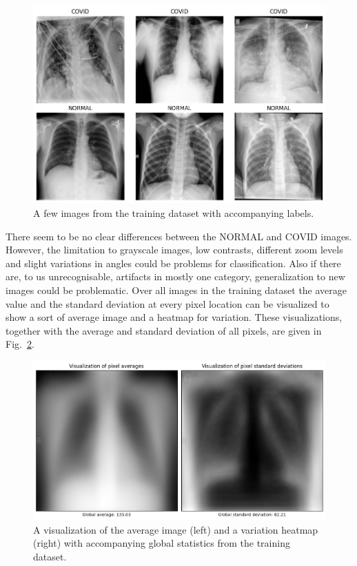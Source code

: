 \documentclass[conference]{IEEEtran}
\begin{document}
\begin{figure}[htbp]
\centerline{\includegraphics[width=\linewidth]{Images/example_images.png}}
\caption{A few images from the training dataset with accompanying labels.}
\label{fig:example_images}
\end{figure}

There seem to be no clear differences between the NORMAL and COVID images. However, the limitation to grayscale images, low contrasts, different zoom levels and slight variations in angles could be problems for classification. Also if there are, to us unrecognisable, artifacts in mostly one category, generalization to new images could be problematic.
Over all images in the training dataset the average value and the standard deviation at every pixel location can be visualized to show a sort of average image and a heatmap for variation. These visualizations, together with the average and standard deviation of all pixels, are given in Fig.~\ref{fig:pixel_statistics}.

\begin{figure}[htbp]
\centerline{\includegraphics[width=\linewidth]{Images/pixel_statistics.png}}
\caption{A visualization of the average image (left) and a variation heatmap (right) with accompanying global statistics from the training dataset.}
\label{fig:pixel_statistics}
\end{figure}
\end{document}
